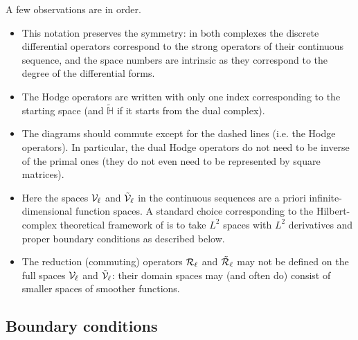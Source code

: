 \documentclass[11pt]{article}
\begin{document}
A few observations are in order.
\begin{itemize}
    \item This notation preserves the symmetry:
		in both complexes the discrete differential operators correspond to the strong operators of their continuous sequence, and the space numbers are intrinsic as they correspond to the degree of the differential forms.
		
		\item The Hodge operators are written with only one index corresponding to the starting space (and $\tilde{\mathbb{H}}$ if it starts from the dual complex).

		\item The diagrams should commute except for the dashed lines (i.e. the Hodge operators). In particular, the dual Hodge operators do not need to be inverse of the primal ones
		(they do not even need to be represented by square matrices).

		\item Here the spaces $\mathcal{V}_\ell$ and $\tilde{\mathcal{V}}_\ell$ in the continuous sequences 
		are a priori infinite-dimensional function spaces. A standard choice corresponding
		to the Hilbert-complex theoretical framework of \cite{Arnold.Falk.Winther.2010.bams}
		is to take $L^2$ spaces with $L^2$ derivatives and proper boundary conditions as 
		described below.		
		
		\item The reduction (commuting) operators 
		$\mathcal{R}_\ell$ and $\tilde {\mathcal{R}}_\ell$ may not be defined 
		on the full spaces $\mathcal{V}_\ell$ and $\tilde{\mathcal{V}}_\ell$: their domain spaces may 
		(and often do) consist of smaller spaces of smoother functions.

\end{itemize}

\subsection{Boundary conditions}
\label{sec:bc}
\end{document}
